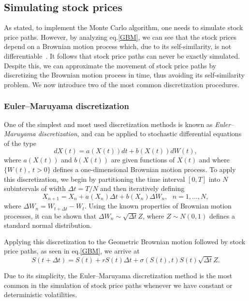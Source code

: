 \subsection{Simulating stock prices}
\label{subsection:Simulating stock prices}
As stated, to implement the Monte Carlo algorithm, one needs to simulate stock price paths. However, by analyzing eq.\eqref{GBM}, we can see that the stock prices depend on a Brownian motion process which, due to its self-similarity, is not differentiable~\citep{Mikosch}. It follows that stock price paths can never be exactly simulated. Despite this, we can approximate the movement of stock price paths by discretizing the Brownian motion process in time, thus avoiding its self-similarity problem. We now introduce two of the most common discretization procedures.

\subsubsection{Euler–Maruyama discretization}
One of the simplest and most used discretization methods is known as \emph{Euler–Maruyama discretization}, and can be applied to stochastic differential equations of the type
\begin{equation}\label{SDE}
dX(t)=a(X(t))dt+b(X(t))dW(t),
\end{equation}
\noindent where $a(X(t))$ and $b(X(t))$ are given functions of $X(t)$ and where $\{W(t),\ t>0\}$ defines a one-dimensional Brownian motion process.
To apply this discretization, we begin by partitioning the time interval $[0,T]$ into $N$ subintervals of width $\Delta t=T/N$ and then iteratively defining
\begin{equation}
X_{n+1}=X_n+a(X_n)\Delta t+b(X_n)\Delta W_n,\ \ \ n=1,\ldots,N,
\end{equation}
\noindent where $\Delta W_n=W_{t+\Delta t}-W_{t}$.
Using the known properties of Brownian motion processes, it can be shown that $\Delta W_n\sim \sqrt{\Delta t}Z$, where $Z\sim N(0,1)$ defines a standard normal distribution.

Applying this discretization to the Geometric Brownian motion followed by stock price paths, as seen in eq.\eqref{GBM}, we arrive at
\begin{equation}
S(t+\Delta t)=S(t)+rS(t)\Delta t+\sigma(S(t),t)S(t)\sqrt{\Delta t}Z.
\end{equation}

Due to its simplicity, the Euler–Maruyama discretization method is the most common in the simulation of stock price paths whenever we have constant or deterministic volatilities.


